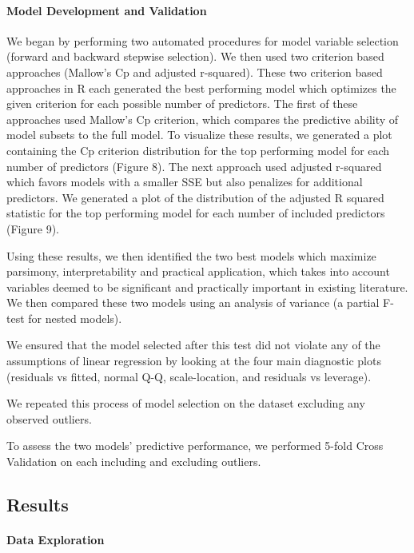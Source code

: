 \documentclass[
]{article}
\begin{document}
\hypertarget{model-development-and-validation}{%
\paragraph{Model Development and
Validation}\label{model-development-and-validation}}

We began by performing two automated procedures for model variable
selection (forward and backward stepwise selection). We then used two
criterion based approaches (Mallow's Cp and adjusted r-squared). These
two criterion based approaches in R each generated the best performing
model which optimizes the given criterion for each possible number of
predictors. The first of these approaches used Mallow's Cp criterion,
which compares the predictive ability of model subsets to the full
model. To visualize these results, we generated a plot containing the Cp
criterion distribution for the top performing model for each number of
predictors (Figure 8). The next approach used adjusted r-squared which
favors models with a smaller SSE but also penalizes for additional
predictors. We generated a plot of the distribution of the adjusted R
squared statistic for the top performing model for each number of
included predictors (Figure 9).

Using these results, we then identified the two best models which
maximize parsimony, interpretability and practical application, which
takes into account variables deemed to be significant and practically
important in existing literature. We then compared these two models
using an analysis of variance (a partial F-test for nested models).

We ensured that the model selected after this test did not violate any
of the assumptions of linear regression by looking at the four main
diagnostic plots (residuals vs fitted, normal Q-Q, scale-location, and
residuals vs leverage).

We repeated this process of model selection on the dataset excluding any
observed outliers.

To assess the two models' predictive performance, we performed 5-fold
Cross Validation on each including and excluding outliers.

\hypertarget{results}{%
\subsection{Results}\label{results}}

\hypertarget{data-exploration-1}{%
\paragraph{Data Exploration}\label{data-exploration-1}}
\end{document}
